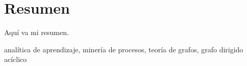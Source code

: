 \chapter*{Resumen}

Aquí va mi resumen.

\small{ analítica de aprendizaje, \; minería de procesos, \; teoría de grafos, \; grafo dirigido acíclico}

\newpage